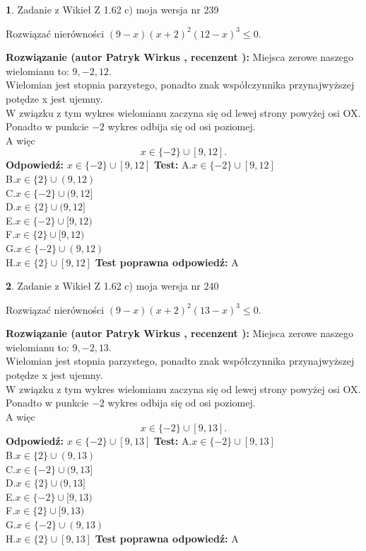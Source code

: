 \documentclass[12pt, a4paper]{article}
\theoremstyle{definition} %
\newtheorem{zad}{}
\newcommand{\zadStart}[1]{\begin{zad}#1\newline}
\newcommand{\zadStop}{\end{zad}}
\newcommand{\rozwStart}[2]{\noindent \textbf{Rozwiązanie (autor #1 , recenzent #2): }\newline}
\newcommand{\rozwStop}{\newline}
\newcommand{\odpStart}{\noindent \textbf{Odpowiedź:}\newline}
\newcommand{\odpStop}{\newline}
\newcommand{\testStart}{\noindent \textbf{Test:}\newline}
\newcommand{\testStop}{\newline}
\newcommand{\kluczStart}{\noindent \textbf{Test poprawna odpowiedź:}\newline}
\newcommand{\kluczStop}{\newline}
\begin{document}
\zadStart{Zadanie z Wikieł Z 1.62 c) moja wersja nr 239}

Rozwiązać nierówności $(9-x)(x+2)^{2}(12-x)^{3}\le0$.
\zadStop
\rozwStart{Patryk Wirkus}{}
Miejsca zerowe naszego wielomianu to: $9, -2, 12$.\\
Wielomian jest stopnia parzystego, ponadto znak współczynnika przy\linebreak najwyższej potędze x jest ujemny.\\ W związku z tym wykres wielomianu zaczyna się od lewej strony powyżej osi OX.\\
Ponadto w punkcie $-2$ wykres odbija się od osi poziomej.\\
A więc $$x \in \{-2\} \cup [9,12].$$
\rozwStop
\odpStart
$x \in \{-2\} \cup [9,12]$
\odpStop
\testStart
A.$x \in \{-2\} \cup [9,12]$\\
B.$x \in \{2\} \cup (9,12)$\\
C.$x \in \{-2\} \cup (9,12]$\\
D.$x \in \{2\} \cup (9,12]$\\
E.$x \in \{-2\} \cup [9,12)$\\
F.$x \in \{2\} \cup [9,12)$\\
G.$x \in \{-2\} \cup (9,12)$\\
H.$x \in \{2\} \cup [9,12]$
\testStop
\kluczStart
A
\kluczStop



\zadStart{Zadanie z Wikieł Z 1.62 c) moja wersja nr 240}

Rozwiązać nierówności $(9-x)(x+2)^{2}(13-x)^{3}\le0$.
\zadStop
\rozwStart{Patryk Wirkus}{}
Miejsca zerowe naszego wielomianu to: $9, -2, 13$.\\
Wielomian jest stopnia parzystego, ponadto znak współczynnika przy\linebreak najwyższej potędze x jest ujemny.\\ W związku z tym wykres wielomianu zaczyna się od lewej strony powyżej osi OX.\\
Ponadto w punkcie $-2$ wykres odbija się od osi poziomej.\\
A więc $$x \in \{-2\} \cup [9,13].$$
\rozwStop
\odpStart
$x \in \{-2\} \cup [9,13]$
\odpStop
\testStart
A.$x \in \{-2\} \cup [9,13]$\\
B.$x \in \{2\} \cup (9,13)$\\
C.$x \in \{-2\} \cup (9,13]$\\
D.$x \in \{2\} \cup (9,13]$\\
E.$x \in \{-2\} \cup [9,13)$\\
F.$x \in \{2\} \cup [9,13)$\\
G.$x \in \{-2\} \cup (9,13)$\\
H.$x \in \{2\} \cup [9,13]$
\testStop
\kluczStart
A
\kluczStop
\end{document}
